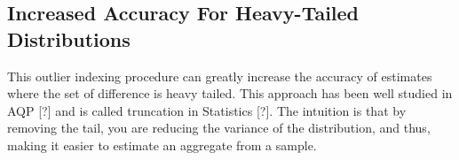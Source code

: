\subsection{Increased Accuracy For Heavy-Tailed Distributions}

This outlier indexing procedure can greatly increase the accuracy
of estimates where the set of difference is heavy tailed. This approach
has been well studied in AQP {[}?{]} and is called truncation in Statistics
{[}?{]}. The intuition is that by removing the tail, you are reducing
the variance of the distribution, and thus, making it easier to estimate
an aggregate from a sample.